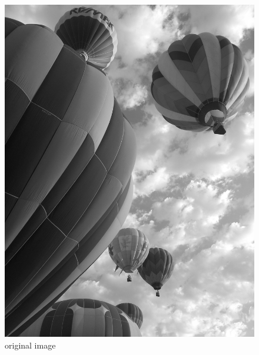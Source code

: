 \begin{figure}[ht]
\begin{minipage}[b]{.45\linewidth}
\centering
\includegraphics[width=\textwidth]{baloonsbw}
\caption*{original image}
\end{minipage}
\hspace{0.5cm}
\begin{minipage}[b]{0.45\linewidth}
\centering

\end{minipage}
\end{figure}
